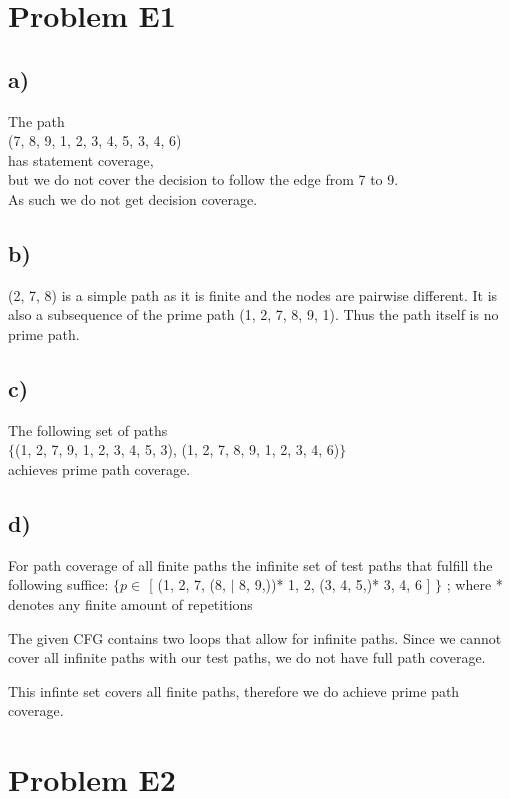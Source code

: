 \documentclass[12pt]{article}
\begin{document}
\lstset{language=C++}

\section*{Problem E1}
\subsection*{a)}
The path \\
(7, 8, 9, 1, 2, 3, 4, 5, 3, 4, 6) \\
has statement coverage, \\
but we do not cover the decision to follow the edge from 7 to 9. \\
As such we do not get decision coverage.

\subsection*{b)}
(2, 7, 8) is a simple path as it is finite and the nodes are pairwise different.
It is also a subsequence of the prime path (1, 2, 7, 8, 9, 1).
Thus the path itself is no prime path.

\subsection*{c)}
The following set of paths \\
$\{$(1, 2, 7, 9, 1, 2, 3, 4, 5, 3), (1, 2, 7, 8, 9, 1, 2, 3, 4, 6)$\}$ \\
achieves prime path coverage. 


\subsection*{d)}
For path coverage of all finite paths the infinite set of test paths that fulfill the following suffice:
$\{ p \in $ [ (1, 2, 7, (8, $|$ 8, 9,))* 1, 2, (3, 4, 5,)* 3, 4, 6 ] $\}$ ; where * denotes any finite amount of repetitions

The given CFG contains two loops that allow for infinite paths.
Since we cannot cover all infinite paths with our test paths, we do not have full path coverage.

This infinte set covers all finite paths, therefore we do achieve prime path coverage. 
\section*{Problem E2}
\end{document}
